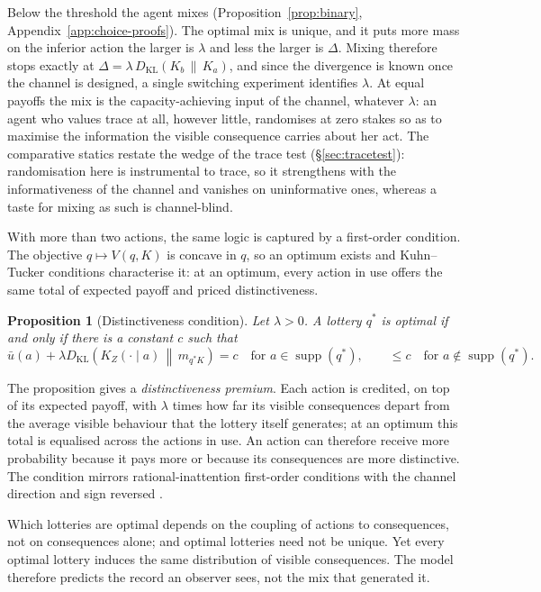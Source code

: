 \documentclass[11pt,a4paper]{article}
\newtheorem{proposition}[theorem]{Proposition}
\theoremstyle{definition}
\newcommand{\supp}{\operatorname{supp}}
\newcommand{\KL}{D_{\mathrm{KL}}}
\newcommand{\1}{\mathbf 1}
\begin{document}
Below the threshold the agent mixes (Proposition~\ref{prop:binary}, Appendix~\ref{app:choice-proofs}).  The
optimal mix is unique, and it puts more mass on the inferior action the larger is $\lambda$ and less the larger
is $\Delta$.  Mixing therefore stops exactly at $\Delta=\lambda\,\KL(K_b\,\|\,K_a)$, and since the divergence is
known once the channel is designed, a single switching experiment identifies $\lambda$.  At equal payoffs the
mix is the capacity-achieving input of the channel, whatever $\lambda$: an agent who values trace at all,
however little, randomises at zero stakes so as to maximise the information the visible consequence carries
about her act.  The comparative statics restate the wedge of the trace test (\S\ref{sec:tracetest}):
randomisation here is instrumental to trace, so it strengthens with the informativeness of the channel and
vanishes on uninformative ones, whereas a taste for mixing as such is channel-blind.

With more than two actions, the same logic is captured by a first-order condition.  The objective
$q\mapsto V(q,K)$ is concave in $q$, so an optimum exists and Kuhn--Tucker conditions characterise it: at an
optimum, every action in use offers the same total of expected payoff and priced distinctiveness.

\begin{proposition}[Distinctiveness condition]\label{prop:optimal-choice}
Let $\lambda>0$.  A lottery $q^*$ is optimal if and only if there is a constant $c$ such that
\[
 \bar u(a)+\lambda\KL\!\left(K_Z(\cdot\mid a)\,\middle\|\,m_{q^*K}\right)=c
 \quad\text{for }a\in\supp(q^*),
 \qquad
 \le c\quad\text{for }a\notin\supp(q^*).
\]
\end{proposition}

The proposition gives a \emph{distinctiveness premium}.  Each action is credited, on top of its expected payoff,
with $\lambda$ times how far its visible consequences depart from the average visible behaviour that the lottery
itself generates; at an optimum this total is equalised across the actions in use.  An action can therefore receive
more probability because it pays more or because its consequences are more distinctive.  The
condition mirrors rational-inattention first-order conditions with the channel direction and sign reversed
\cite{Sims2003,MatejkaMcKay2015}.

Which lotteries are optimal depends on the coupling of actions to consequences, not on consequences alone; and
optimal lotteries need not be unique.  Yet every optimal lottery induces the same distribution of visible
consequences.  The model therefore predicts the record an observer sees, not the mix that generated it.
\end{document}
